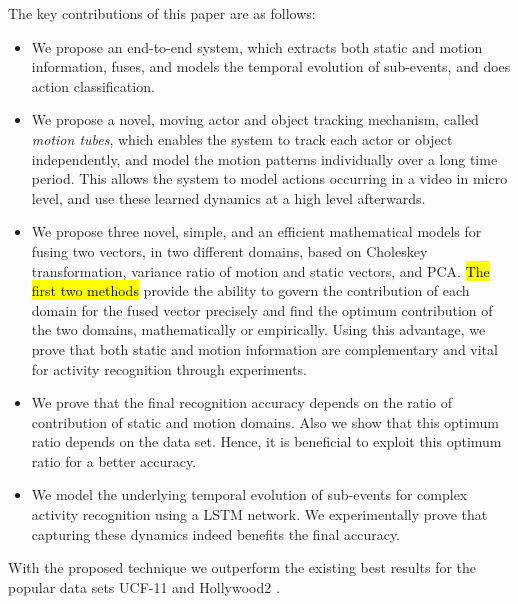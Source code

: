 The key contributions of this paper are as follows:

 \begin{itemize}
  \item We propose an end-to-end system, which  extracts both static and motion information, fuses, and models the
temporal evolution of sub-events, and does action classification.
  \item We propose a novel, moving actor and object tracking mechanism, called \textit{motion tubes},
which enables the system to track each actor or object independently, and model the motion patterns individually over a long time period.
This allows the system to model actions occurring in a video in micro level, and use these learned dynamics
at a high level afterwards.
 \item We propose three novel, simple, and an efficient mathematical models for fusing two vectors,
in two different domains, based on Choleskey transformation, variance ratio of motion and static vectors, and PCA. \hl{The first two methods} provide
the ability to govern the contribution of each domain for the fused vector precisely and find the optimum contribution of the two domains, mathematically or empirically. Using this advantage, we prove that both static and motion information are complementary and vital for activity recognition through experiments.
 \item We prove that the final recognition accuracy depends on the ratio of contribution of static and motion domains. Also we show that
 this optimum ratio depends on the data set. Hence, it is beneficial to exploit this optimum ratio for a better accuracy.
  \item We model the underlying temporal evolution of sub-events for complex activity recognition using a LSTM network. We experimentally
prove that capturing these dynamics indeed benefits the final accuracy.
 \end{itemize}

With the proposed technique
we outperform the existing best results for the popular data sets UCF-11 \cite{liu2009recognizing}
and Hollywood2 \cite{marszalek2009actions}.


